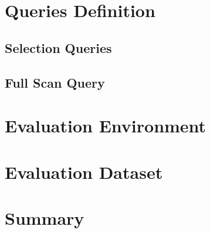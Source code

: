 {\section{Queries Definition}
\label{qryDef}
\subsection{Selection Queries}
\subsection{Full Scan Query}


\section{Evaluation Environment}
\label{evalEnv}


\section{Evaluation Dataset}
\label{dataset}


\section{Summary}
\label{summary}

}